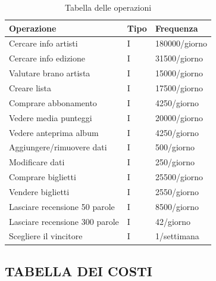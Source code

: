 \documentclass{article}
\begin{document}
\begin{table}[ht]
    \centering
    \begin{tabular}{|p{5cm}|p{0.75cm}|p{3cm}|}
        \hline
         \textbf{Operazione}&\textbf{Tipo}  &\textbf{Frequenza} \\
         \hline
         Cercare info artisti&I  &180000/giorno \\
         \hline
         Cercare info edizione&I &31500/giorno \\
         \hline
         Valutare brano artista&I  &15000/giorno \\
         \hline
         Creare lista&I  &17500/giorno \\
         \hline
         Comprare abbonamento&I  &4250/giorno \\
         \hline
         Vedere media punteggi&I  &20000/giorno\\
         \hline
         Vedere anteprima album&I  &4250/giorno \\
         \hline
         Aggiungere/rimuovere dati&I  &500/giorno \\
         \hline
         Modificare dati&I  &250/giorno \\
         \hline
         Comprare biglietti&  I&25500/giorno \\
         \hline
         Vendere biglietti&I &2550/giorno \\
         \hline
         Lasciare recensione 50 parole&I  &8500/giorno \\
         \hline
         Lasciare recensione 300 parole&I  &42/giorno \\
         \hline
         Scegliere il vincitore&I  &1/settimana \\
         \hline
    \end{tabular}
    \caption{Tabella delle operazioni}
    \label{tab:my_label}
\end{table}
\newpage
\subsection{TABELLA DEI COSTI}
\end{document}
